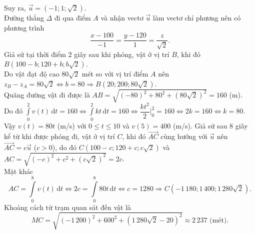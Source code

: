 \begin{ex}
{\begin{itemchoice}
			Suy ra, $\overrightarrow{u}=\left(-1;1;\sqrt{2}\right)$.\\
			Đường thẳng $\Delta$ đi qua điểm $A$ và nhận vectơ $\overrightarrow{u}$ làm vectơ chỉ phương nên có phương trình
			$$\dfrac{x-100}{-1} = \dfrac{y-120}{1} = \dfrac{z}{\sqrt{2}}.$$
			\itemch Giả sử tại thời điểm $2$ giây sau khi phóng, vật ở vị trí $B$, khi đó $B\left(100-b; 120+b;b\sqrt{2}\right)$.\\
			Do vật đạt độ cao $80\sqrt{2}$ mét so với vị trí điểm $A$ nên $z_B-z_A=80\sqrt{2} \Leftrightarrow b=80 \Rightarrow B\left(20;200;80\sqrt{2}\right)$.\\
			Quãng đường vật đi được là $AB=\sqrt{(-80)^2+80^2+\left(80\sqrt{2}\right)^2} = 160$ (m).\\
			Do đó $\displaystyle\int\limits_{0}^{2} v(t) \mathrm{\,d}t = 160 \Leftrightarrow \displaystyle\int\limits_{0}^{2} kt \mathrm{\,d}t = 160 \Leftrightarrow \dfrac{kt^2}{2} \Bigg|_0^2 = 160 \Leftrightarrow 2k=160 \Leftrightarrow k=80$.\\
			Vậy $v(t)=80t$ (m/s) với $0\leq t\leq 10$ và $v(5)=400$ (m/s).
			\itemch Giả sử sau $8$ giây kể từ khi được phóng đi, vật ở vị trí $C$, khi đó $\overrightarrow{AC}$ cùng hướng với $\overrightarrow{u}$ nên $\overrightarrow{AC}=c\overrightarrow{u}$ ($c>0$), do đó $C(100-c;120+c;c\sqrt{2})$ và $AC=\sqrt{(-c)^2+c^2+\left(c\sqrt{2}\right)^2}=2c$.\\
			Mặt khác
			$$AC=\displaystyle\int\limits_{0}^{8} v(t) \mathrm{\,d}t \Leftrightarrow 2c = \displaystyle\int\limits_{0}^{8} 80t \mathrm{\,d}t \Leftrightarrow c = 1280 \Rightarrow C\left(-1\,180; 1\,400; 1\,280\sqrt{2}\right).$$
			Khoảng cách từ trạm quan sát đến vật là $$MC = \sqrt{(-1\,200)^2+600^2+\left(1\,280\sqrt{2}-20\right)^2} \approx 2\,237 \text{  (mét)}.$$
		\end{itemchoice}
	}
\end{ex}

